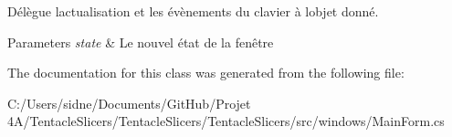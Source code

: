 Délègue l\textquotesingle{}actualisation et les évènements du clavier à l\textquotesingle{}objet donné. 


\begin{DoxyParams}{Parameters}
{\em state} & Le nouvel état de la fenêtre \\
\hline
\end{DoxyParams}


The documentation for this class was generated from the following file\+:\begin{DoxyCompactItemize}
\item 
C\+:/\+Users/sidne/\+Documents/\+Git\+Hub/\+Projet 4\+A/\+Tentacle\+Slicers/\+Tentacle\+Slicers/\+Tentacle\+Slicers/src/windows/Main\+Form.\+cs\end{DoxyCompactItemize}
